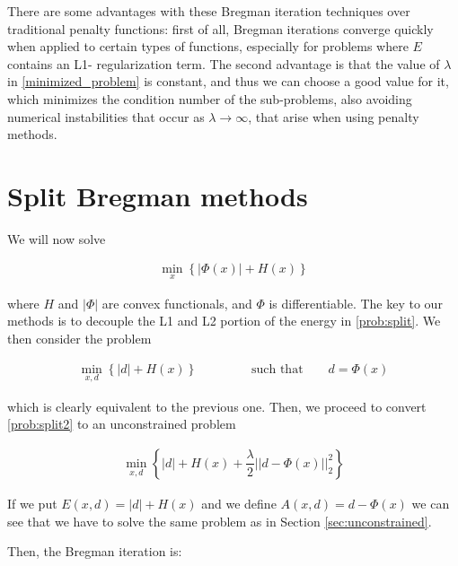 There are some advantages with these Bregman iteration techniques over traditional penalty functions: first of all, Bregman iterations converge quickly when applied to certain types of functions, especially for problems where $E$ contains an L1- regularization term. The second advantage is that the value of $\lambda$ in \eqref{minimized_problem} is constant, and thus we can choose a good value for it, which minimizes the condition number of the sub-problems, also avoiding numerical instabilities that occur as $\lambda \to \infty$, that arise when using penalty methods.

\section{Split Bregman methods}

We will now solve

\begin{align} \label{prob:split}
\min_x \left\{|\Phi(x)|+H(x)\right\}
\end{align}

where $H$ and $|\Phi|$ are convex functionals, and $\Phi$ is differentiable. The key to our methods is to decouple the L1 and L2 portion of the energy in \eqref{prob:split}. We then consider the problem

\begin{align} \label{prob:split2}
\min_{x,d} \left\{ |d| + H(x) \right\} \qquad \qquad \mbox{ such that} \qquad d=\Phi(x)
\end{align}

which is clearly equivalent to the previous one. Then, we proceed to convert \eqref{prob:split2} to an unconstrained problem

\begin{align}
\min_{x,d} \left\{ |d| + H(x) + \dfrac{\lambda}{2} ||d-\Phi(x)||_2^2 \right\}
\end{align}

If we put $E(x,d) = |d| + H(x)$ and we define $A(x,d) = d-\Phi(x)$ we can see that  we have to solve the same problem as in Section \ref{sec:unconstrained}.

Then, the Bregman iteration is:

